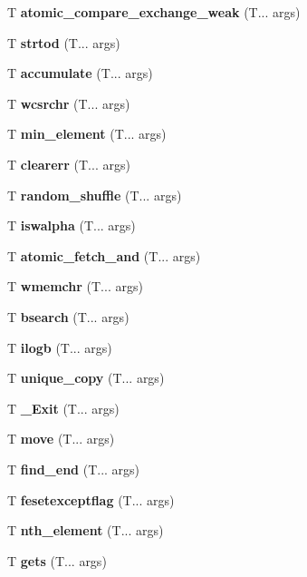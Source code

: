 \begin{DoxyCompactItemize}
\item 
\mbox{\label{atomic_compare_exchange}} 
T \textbf{ atomic\+\_\+compare\+\_\+exchange\+\_\+weak} (T... args)
\item 
\mbox{\label{strtof}} 
T \textbf{ strtod} (T... args)
\item 
\mbox{\label{accumulate}} 
T \textbf{ accumulate} (T... args)
\item 
\mbox{\label{wcsrchr}} 
T \textbf{ wcsrchr} (T... args)
\item 
\mbox{\label{min_element}} 
T \textbf{ min\+\_\+element} (T... args)
\item 
\mbox{\label{clearerr}} 
T \textbf{ clearerr} (T... args)
\item 
\mbox{\label{random_shuffle}} 
T \textbf{ random\+\_\+shuffle} (T... args)
\item 
\mbox{\label{iswalpha}} 
T \textbf{ iswalpha} (T... args)
\item 
\mbox{\label{atomic_fetch_sub}} 
T \textbf{ atomic\+\_\+fetch\+\_\+and} (T... args)
\item 
\mbox{\label{wmemchr}} 
T \textbf{ wmemchr} (T... args)
\item 
\mbox{\label{bsearch}} 
T \textbf{ bsearch} (T... args)
\item 
\mbox{\label{ilogb}} 
T \textbf{ ilogb} (T... args)
\item 
\mbox{\label{unique_copy}} 
T \textbf{ unique\+\_\+copy} (T... args)
\item 
\mbox{\label{_Exit}} 
T \textbf{ \+\_\+\+Exit} (T... args)
\item 
\mbox{\label{move}} 
T \textbf{ move} (T... args)
\item 
\mbox{\label{find_end}} 
T \textbf{ find\+\_\+end} (T... args)
\item 
\mbox{\label{feexceptflag}} 
T \textbf{ fesetexceptflag} (T... args)
\item 
\mbox{\label{nth_element}} 
T \textbf{ nth\+\_\+element} (T... args)
\item 
\mbox{\label{gets}} 
T \textbf{ gets} (T... args)
\item 

\end{DoxyCompactItemize}
